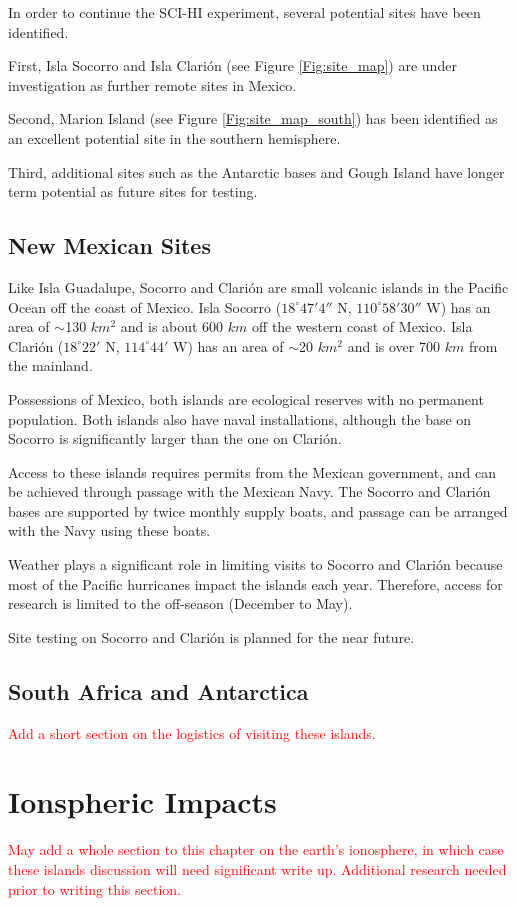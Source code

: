In order to continue the SCI-HI experiment, several potential sites have been identified.

First, Isla Socorro and Isla Clari\'{o}n (see Figure \ref{Fig:site_map}) are under investigation as further remote sites in Mexico.

Second, Marion Island (see Figure \ref{Fig:site_map_south}) has been identified as an excellent potential site in the southern hemisphere.

Third, additional sites such as the Antarctic bases and Gough Island have longer term potential as future sites for testing. 

\subsection{New Mexican Sites}
Like Isla Guadalupe, Socorro and Clari\'{o}n are small volcanic islands in the Pacific Ocean off the coast of Mexico. Isla Socorro ($18^\circ 47' 4''$ N, $110^\circ 58' 30''$ W) has an area of $\sim$130 $km^2$ and is about 600 $km$ off the western coast of Mexico. Isla Clari\'{o}n ($18^\circ 22'$ N, $114^\circ 44'$ W) has an area of $\sim$20 $km^2$ and is over 700 $km$ from the mainland.

Possessions of Mexico, both islands are ecological reserves with no permanent population. Both islands also have naval installations, although the base on Socorro is significantly larger than the one on Clari\'{o}n. 

Access to these islands requires permits from the Mexican government, and can be achieved through passage with the Mexican Navy. The Socorro and Clari\'{o}n bases are supported by twice monthly supply boats, and passage can be arranged with the Navy using these boats. 

Weather plays a significant role in limiting visits to Socorro and Clari\'{o}n because most of the Pacific hurricanes impact the islands each year. Therefore, access for research is limited to the off-season (December to May). 

Site testing on Socorro and Clari\'{o}n is planned for the near future.

\subsection{South Africa and Antarctica}


\textcolor{red}{Add a short section on the logistics of visiting these islands.}


\section{Ionspheric Impacts}

\textcolor{red}{May add a whole section to this chapter on the earth's ionosphere, in which case these islands discussion will need significant write up. Additional research needed prior to writing this section. }



